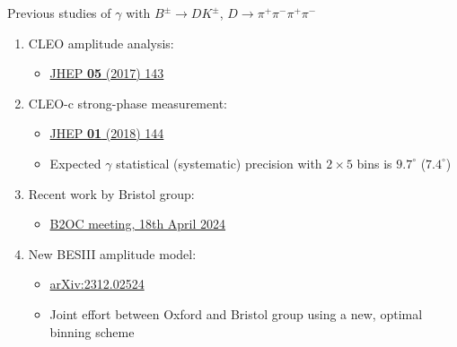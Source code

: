 \documentclass[xcolor={dvipsnames}]{beamer}
\begin{document}
\begin{frame}{Previous studies of $\gamma$ with $B^\pm\to DK^\pm$, $D\to\pi^+\pi^-\pi^+\pi^-$}
  \vspace{0.0cm}
  \begin{enumerate}
    \setlength\itemsep{1.2em}
    \item{CLEO amplitude analysis:}
    \begin{itemize}
      \item{\href{https://arxiv.org/abs/1703.08505}{JHEP \textbf{05} (2017) 143}}
    \end{itemize}
    \item{CLEO-c strong-phase measurement:}
    \begin{itemize}
      \item{\href{https://arxiv.org/abs/1709.03467}{JHEP \textbf{01} (2018) 144}}
      \item{Expected $\gamma$ statistical (systematic) precision with $2\times 5$ bins is $9.7^\circ$ ($7.4^\circ$)}
    \end{itemize}
    \item{Recent work by Bristol group:}
    \begin{itemize}
      \item{\href{https://indico.cern.ch/event/1407261/contributions/5914917/}{B2OC meeting, 18th April 2024}}
    \end{itemize}
    \item{New BESIII amplitude model:}
    \begin{itemize}
      \item{\href{https://arxiv.org/abs/2312.02524}{arXiv:2312.02524}}
      \item{Joint effort between Oxford and Bristol group using a new, optimal binning scheme}
    \end{itemize}
  \end{enumerate}
\end{frame}
\end{document}
